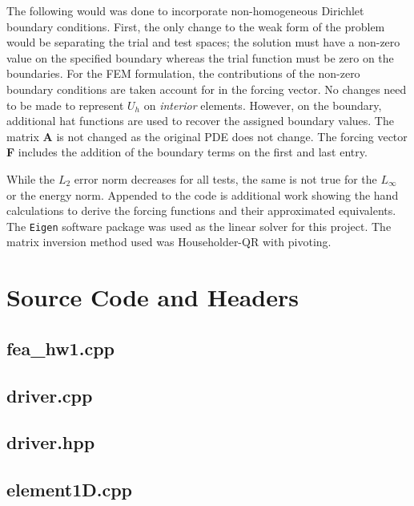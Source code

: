 \documentclass[a4paper, 12pt]{article}
\begin{document}
\noindent
The following would was done to incorporate non-homogeneous Dirichlet boundary conditions.
First, the only change to the weak form of the problem would be separating the 
trial and test spaces; the solution must have a non-zero value on the specified 
boundary whereas the trial function must be zero on the boundaries.
For the FEM formulation, the contributions of the non-zero boundary
conditions are taken account for in the forcing vector. 
No changes need to be made to represent $U_h$ on \emph{interior} elements.
However, on the boundary, additional hat functions are used to recover the
assigned boundary values.
The matrix \textbf{A} is not changed as the original PDE does not change. 
The forcing vector \textbf{F} includes the addition of the boundary terms
on the first and last entry.


While the $L_2$ error norm decreases for all tests, the same is not true 
for the $L_\infty$ or the energy norm. Appended to the code is additional
work showing the hand calculations to derive the forcing functions and 
their approximated equivalents. The \texttt{Eigen} software package
was used as the linear solver for this project. 
The matrix inversion method used was Householder-QR with pivoting.

\newpage
\appendix
\section{Source Code and Headers} \label{sec:code}

\subsection{fea\_hw1.cpp} \label{subsec:fea_hw1.cpp}


\subsection{driver.cpp} \label{subsec:driver.cpp}

\subsection{driver.hpp} \label{subsec:driver.hpp}


\subsection{element1D.cpp} \label{subsec:element1D.cpp}

\end{document}
